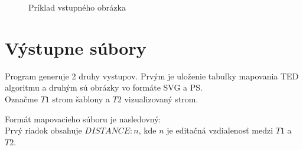 \begin{figure}
  \caption{Príklad vstupného obrázka}
  \label{obr:mouse_ps}
\end{figure}

\section{Výstupne súbory}

Program generuje 2 druhy vystupov. Prvým je uloženie tabuľky mapovania TED algoritmu a druhým sú obrázky
vo formáte SVG a PS. \\

Označme $T1$ strom šablony a $T2$ vizualizovaný strom.

Formát mapovacieho súboru je nasledovný: \\
Prvý riadok obsahuje $DISTANCE: n$, kde $n$ je
editačná vzdialenosť medzi $T1$ a $T2$.

